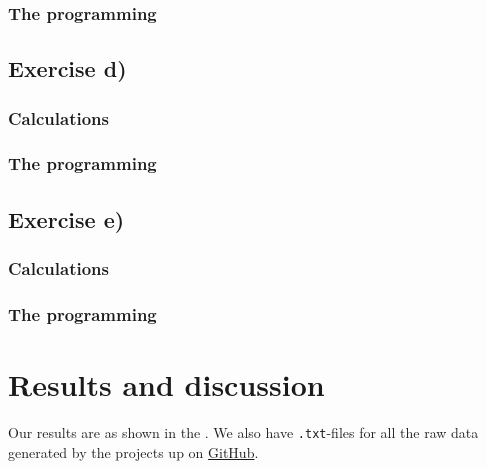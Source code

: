 \documentclass{article}
\begin{document}
  \subsubsection{The programming}




\subsection{Exercise d)} \label{sec:Method d)}

  \subsubsection{Calculations}




  \subsubsection{The programming}



\subsection{Exercise e)} \label{sec:Method e)}


  \subsubsection{Calculations}




  \subsubsection{The programming}





\vspace{1cm}

\section{Results and discussion} \label{sec:Results}

  Our results are as shown in the . We also have \texttt{.txt}-files for all the raw data generated by the projects up on \href{https://github.com/Erikbgram/Fys3150}{GitHub}. \\
\end{document}
